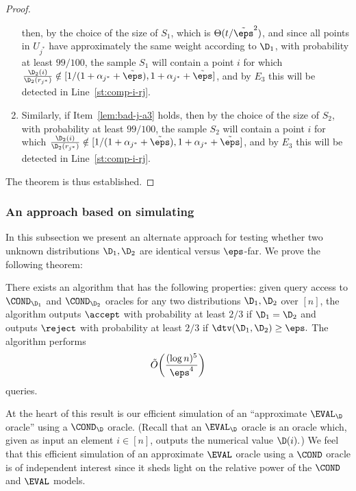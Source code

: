 \begin{proof}
\begin{enumerate}
then, by the choice of the size of $S_1$,
which is $\Theta(t/\tilde{\eps}^2)$, and since all points in $U_{j^\ast}$
have approximately the same weight according to $\D_1$,
with probability
at least $99/100$, the sample $S_1$ will contain a point $i$ for
which \mbox{$\frac{\D_2(i)}{\D_2(r_{j^\ast})}
        \notin[1/(1+\alpha_{j^\ast}+\tilde{\eps}), 1+\alpha_{j^\ast}+\tilde{\eps}]$},
        and by $E_3$ this will be detected in Line~\ref{st:comp-i-rj}.
\item Similarly, if Item~\ref{lem:bad-j-a3} holds,
then by the choice of the size of $S_2$, with probability
at least $99/100$, the sample $S_2$ will contain a point $i$ for
which \mbox{$\frac{\D_2(i)}{\D_2(r_{j^\ast})}
        \notin[1/(1+\alpha_{j^\ast}+\tilde{\eps}), 1+\alpha_{j^\ast}+\tilde{\eps}]$},
        and by $E_3$ this will be detected in Line~\ref{st:comp-i-rj}.
\end{enumerate}
The theorem is thus established.
\end{proof}
 


\subsubsection{An approach based on simulating \EVAL}\label{ssec:sim-eval}
In this subsection we present an alternate approach for testing
whether two unknown distributions $\D_1,\D_2$ are identical versus
$\eps$-far.  We prove the following theorem:

\begin{theorem} \label{thm:cond-test-d1d2}
There exists an algorithm that has
the following properties: given query access to $\COND_{\D_1}$ and
$\COND_{\D_2}$ oracles for any two distributions
$\D_1,\D_2$ over $[n]$,
the algorithm outputs $\accept$ with probability at least $2/3$ if $\D_1 =
\D_2$ and outputs $\reject$ with probability at least $2/3$ if
$\dtv(\D_1,\D_2) \geq \eps.$
The algorithm performs
\[
\tilde{O}\!\left( {\frac {(\log n)^5}{\eps^4}} \right)
\]
queries.
\end{theorem}

At the heart of this result is our efficient simulation of an ``approximate
$\EVAL_\D$ oracle'' using a $\COND_\D$ oracle.  (Recall
that an $\EVAL_\D$ oracle is an oracle which, given as input
an element $i \in [n]$, outputs the numerical value $\D(i).$)
We feel that this efficient simulation of an approximate $\EVAL$ oracle
using a $\COND$ oracle is of independent interest since it sheds
light on the relative power of the $\COND$ and $\EVAL$ models.

